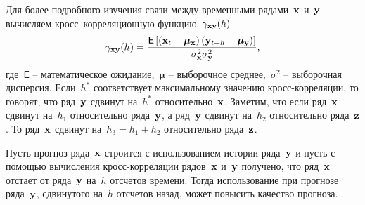 \documentclass[14pt]{article}
\begin{document}
Для более подробного изучения связи между временными рядами~${\bf x}$ и~${\bf y}$ вычисляем кросс--корреляционную функцию~$\gamma_{{\bf xy}}(h)$
$$\gamma_{{\bf xy}}(h) = \frac{\mathsf{E}\left[ \left({\bf x}_t - \boldsymbol{\mu}_{\bf x}\right)\left({\bf y}_{t + h} - \boldsymbol{\mu}_{\bf y}\right) \right]}{\sigma^2_{\bf x}\sigma^2_{\bf y}},$$
где~$\mathsf{E}$ -- математическое ожидание,~$\boldsymbol{\mu}$ -- выборочное среднее,~$\sigma^2$ -- выборочная дисперсия.
Если~$h^*$ соответствует максимальному значению кросс-корреляции, то говорят, что ряд~${\bf y}$ сдвинут на~$h^*$ относительно~${\bf x}$. 		
Заметим, что если ряд~${\bf x}$ сдвинут на~$h_1$ относительно ряда~${\bf y}$, а ряд~${\bf y}$ сдвинут  на~$h_2$ относительно ряда~${\bf z}$. То ряд~${\bf x}$ сдвинут на~$h_3 = h_1 + h_2$ относительно ряда~${\bf z}$.

Пусть прогноз ряда~${\bf x}$ строится с использованием истории ряда~${\bf y}$ и пусть с помощью  вычисления кросс-корреляции рядов~${\bf x}$ и~${\bf y}$  получено, что ряд~${\bf x}$ отстает от ряда~${\bf y}$ на~$h$ отсчетов времени. Тогда использование  при прогнозе ряда~${\bf y}$, сдвинутого на~$h$ отсчетов назад, может повысить качество прогноза.
\end{document}
